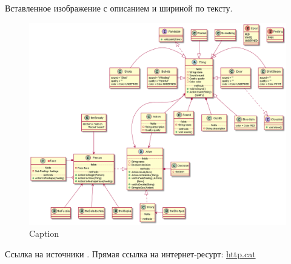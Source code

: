 Вставленное изображение с описанием и шириной по тексту.
\begin{figure}[H] %
    \centering
    \includegraphics[width=\textwidth]{res/UML-class-diagram.png}
    \caption{Caption}
    \label{fig:enter-label}
\end{figure}



Ссылка на источники \cite{itmocompmath}.
Прямая ссылка на интернет-ресурт: \href{https://http.cat/501}{http.cat}
\newpage





